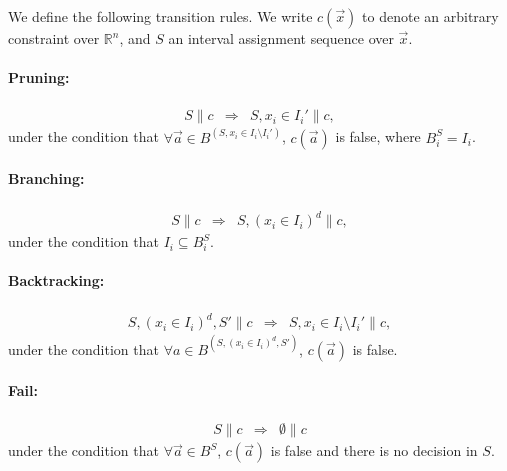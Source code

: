 \documentclass[envcountsect]{llncs}
\begin{document}
\begin{definition} We define the following transition rules.
We write $c(\vec x)$ to denote an arbitrary constraint over $\mathbb{R}^n$, and
$S$ an interval assignment sequence over $\vec x$.

\paragraph{Pruning:}
\begin{eqnarray*}
S\parallel c &\Longrightarrow& S, x_i\in I_i'\parallel c,
\end{eqnarray*}
under the condition that $\forall \vec a\in B^{(S,x_i\in
I_i\setminus I_i')}$,
$c(\vec a)$ is false, where $B^S_i = I_i$.
\paragraph{Branching:}
\begin{eqnarray*}
S\parallel c &\Longrightarrow& S, (x_i\in I_i)^d \parallel c,
\end{eqnarray*}
under the condition that $I_i\subseteq B^S_i$.

\paragraph{Backtracking:}
\begin{eqnarray*}
S, (x_i\in I_i)^d, S'\parallel c &\Longrightarrow& S, x_i\in
I_i\setminus I_i'\parallel c,
\end{eqnarray*}
under the condition that $\forall a\in B^{(S, (x_i\in I_i)^d, S')}$, $c(\vec a)$
is false.

\paragraph{Fail:}
\begin{eqnarray*}
S\parallel c &\Longrightarrow& \emptyset \parallel c
\end{eqnarray*}
under the condition that $\forall \vec a\in B^S$, $c(\vec a)$ is false and there
is no decision in $S$.
\end{definition}
\end{document}
